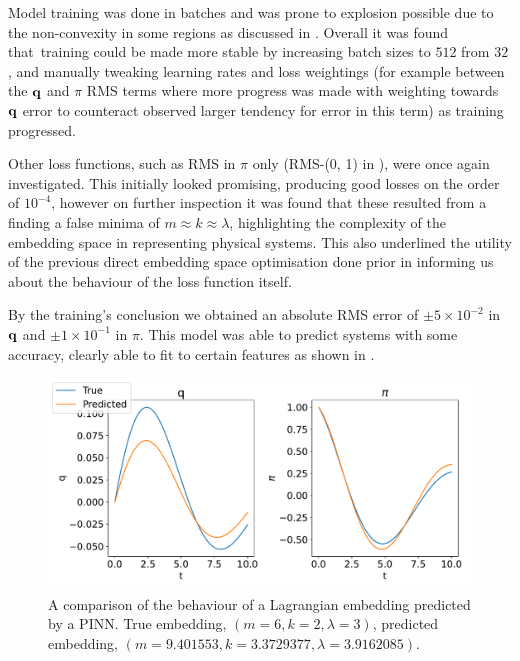 Model training was done in batches and was prone to explosion possible due to the non-convexity in some regions as discussed in . Overall it was found that training could be made more stable by increasing batch sizes to $512$ from $32$, and manually tweaking learning rates and loss weightings (for example between the $\vb q$ and $\pi$ RMS terms where more progress was made with weighting towards $\vb{q}$ error to counteract observed larger tendency for error in this term) as training progressed.

Other loss functions, such as RMS in $\pi$ only (RMS-(0, 1) in ), were once again investigated. This initially looked promising, producing good losses on the order of $10^{-4}$, however on further inspection it was found that these resulted from a finding a false minima of $m \approx k \approx \lambda$, highlighting the complexity of the embedding space in representing physical systems. This also underlined the utility of the previous direct embedding space optimisation done prior in informing us about the behaviour of the loss function itself.

By the training's conclusion we obtained an absolute RMS error of $\pm 5 \times 10^{-2}$ in $\vb{q}$ and $\pm 1 \times 10 ^{-1}$ in $\pi$. This model was able to predict systems with some accuracy, clearly able to fit to certain features as shown in .

\begin{figure}[t]
  \includegraphics[width=\columnwidth]{figures/model-predictions.pdf}
  \caption{A comparison of the behaviour of a Lagrangian embedding predicted by a PINN. True embedding, $(m = 6, k = 2, \lambda = 3)$, predicted embedding, $(m = 9.401553,  k = 3.3729377, \lambda = 3.9162085)$.}
  \label{fig:model-prediction}
\end{figure}

